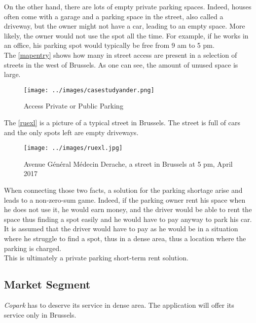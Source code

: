 \documentclass[12pt,a4paper,oneside]{book}
\newcommand{\bp}{\textit{Copark}}
\begin{document}
On the other hand, there are lots of empty private parking spaces. Indeed, houses often come with a garage and a parking space in the street, also called a driveway, but the owner might not have a car, leading to an empty space. More likely, the owner would not use the spot all the time. For example, if he works in an office, his parking spot would typically be free from 9 am to 5 pm.\\

The \autoref{mapentry} shows how many in street access are present in a selection of streets in the west of Brussels. As one can see, the amount of unused space is large.\\


\begin{figure}[h]
\centering
\caption{Access Private or Public Parking\cite{mapentrysrc}}
\label{mapentry}
\texttt{[image: ../images/casestudyander.png]}
\end{figure}

The \autoref{ruexl} is a picture of a typical street in Brussels. The street is full of cars and the only spots left are empty driveways.

\begin{figure}[h]
\centering
\caption{Avenue Général Médecin Derache, a street in Brussels at 5 pm, April 2017}
\label{ruexl}
\texttt{[image: ../images/ruexl.jpg]}
\end{figure}



When connecting those two facts, a solution for the parking shortage arise and leads to a non-zero-sum game. Indeed, if the parking owner rent his space when he does not use it, he would earn money, and the driver would be able to rent the space thus finding a spot easily and he would have to pay anyway to park his car. It is assumed that the driver would have to pay as he would be in a situation where he struggle to find a spot, thus in a dense area, thus a location where the parking is charged.\\

This is ultimately a private parking short-term rent solution.

\subsection{Market Segment}
\bp{} has to deserve its service in dense area. The application will offer its service only in Brussels.\\
\end{document}
